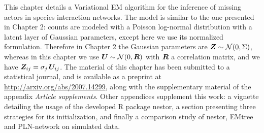 \vspace{0.5cm}
This chapter details a Variational EM algorithm for the inference of missing actors in species interaction networks. The model is similar to the one presented in Chapter 2: counts are modeled with a Poisson log-normal distribution with a latent layer of Gaussian parameters, except here we use its normalized formulation. Therefore in Chapter 2 the Gaussian parameters are ${\boldsymbol{Z}}\sim\mathcal{N}(0,\Sigma)$, whereas in this chapter we use ${\boldsymbol{U}}\sim\mathcal{N}(0,{\boldsymbol{R}})$ with ${\boldsymbol{R}}$ a correlation matrix, and we have ${\boldsymbol{Z}}_{ij} = \sigma_j \, {\boldsymbol{U}}_{ij}$.
The material of this chapter has been submitted to a statistical journal, and is available as a preprint at \url{http://arxiv.org/abs/2007.14299}, along with the supplementary material of the appendix \textit{Article supplements}. Other appendices supplement this work: a vignette detailing the usage of the developed R package nestor, a section presenting three strategies for its initialization, and finally a comparison study of nestor, EMtree and PLN-network on simulated data.


 
 













